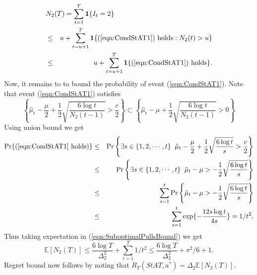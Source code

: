 \documentclass[draft, onecolumn, 12pt]{IEEEtran}
\begin{document}
\begin{eqnarray}
\lefteqn{N_2(T)=\sum_{t=1}^T\boldsymbol{1}\{I_t =2\}}\\
& \leq& u + \sum_{t=u+1}^T \boldsymbol{1}\{\mbox{(\ref{eqn:CondStAT1}) holds}: N_2(t)>u\}\\
\label{eqn:SuboptimalPullsBound}
&\leq&   u + \sum_{t=u+1}^T \boldsymbol{1}\{\mbox{(\ref{eqn:CondStAT1}) holds} \}.
\end{eqnarray}
Now, it remains to to bound the probability of event (\ref{eqn:CondStAT1}). Note that event (\ref{eqn:CondStAT1}) satisfies
\begin{equation}
\left \{\hat{\mu}_t- \frac{\mu}{2} + \frac{1}{2}\sqrt{\frac{6\log t}{N_2(t-1)}}>\frac{c}{2}\right \}
\subset \left \{\hat{\mu}_t- \mu +  \frac{1}{2}\sqrt{\frac{6\log t}{N_2(t-1)}}>0\right \}
\end{equation}
Using union bound we get
\begin{eqnarray}
\Pr\{(\mbox{\ref{eqn:CondStAT1} holds})\} &\leq& \Pr\left\{\exists s\in \{1,2,\cdots, t\}\;\; \hat{\mu}_t -\frac{\mu}{2} +\frac{1}{2}\sqrt{ \frac{6 \log t}{s}} > \frac{c}{2} \right \}\\
&\leq& \Pr\left\{\exists s\in \{1,2,\cdots, t\}\;\; \hat{\mu}_t -\mu > -\frac{1}{2}\sqrt{ \frac{6 \log t}{s}} \right \}\\
&\leq &\sum_{s=1}^t  \Pr\left\{\hat{\mu}_t -\mu > -\frac{1}{2}\sqrt{ \frac{6 \log t}{s}} \right \}\\
&\leq &\sum_{s=1}^{t} \exp\{-\frac{12s\log t}{4s}\}=1/t^2.
\end{eqnarray}
Thus taking expectation in (\ref{eqn:SuboptimalPullsBound}) we get 
\begin{equation}
\label{eqn:ExpectedPull_a2}
\mathbb{E}[N_2(T)]\leq \frac{6 \log T}{\Delta_2^2} + \sum_{t=1}^T 1/t^2 \leq \frac{6 \log T}{\Delta_2^2} + \pi^2/6 +1.
\end{equation}
 Regret bound now follows by noting that  $R_T(StAT,a^*)=\Delta_2 \mathbb{E}[N_2(T)]$.
\end{document}
